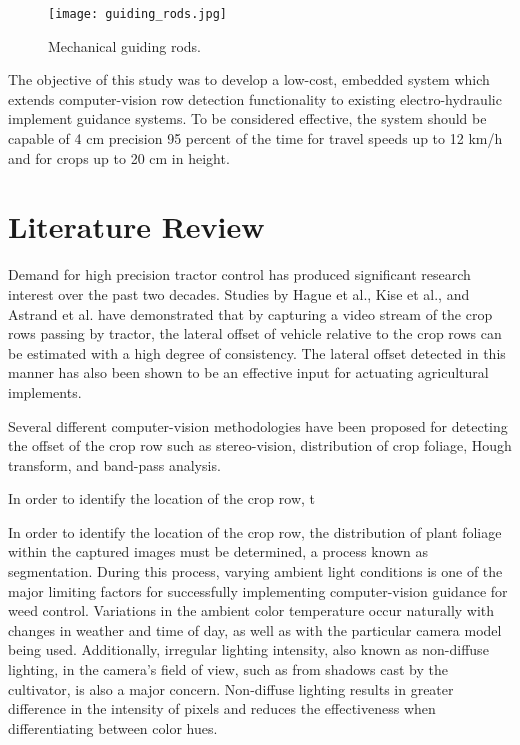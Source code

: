 \begin{figure}
  \centering
  \texttt{[image: guiding\_rods.jpg]}
  \caption{Mechanical guiding rods.}
  \label{fig:guiding_rods}
\end{figure}

The objective of this study was to develop a low-cost, embedded system
which extends computer-vision row detection functionality to existing
electro-hydraulic implement guidance systems.  To be considered
effective, the system should be capable of 4 cm precision 95 percent of the 
time for travel speeds up to 12 km/h and for crops up to 20 cm in
height.

\section{Literature Review}
Demand for high precision tractor control has produced significant
research interest over the past two decades. Studies by Hague et
al., Kise et al., and Astrand et al. have demonstrated that by 
capturing a video stream of the crop rows passing by tractor, the 
lateral offset of vehicle relative to the crop rows can be estimated
with a high degree of consistency. The lateral offset detected in this manner
has also been shown to be an effective input for actuating agricultural 
implements.

Several different computer-vision methodologies have been proposed for 
detecting the offset of the crop row such as stereo-vision, distribution
of crop foliage, Hough transform, and band-pass analysis.

In order to identify the location of the crop row, t

In order to identify the location of the crop row, the distribution of
plant foliage within the captured images must be determined, a process
known as segmentation. During this process, varying ambient light
conditions is one of the major limiting factors for successfully
implementing computer-vision guidance for weed control. Variations in
the ambient color temperature occur naturally with changes in weather
and time of day, as well as with the particular camera model being
used. Additionally, irregular lighting intensity, also known as
non-diffuse lighting, in the camera’s field of view, such as from
shadows cast by the cultivator, is also a major concern. Non-diffuse
lighting results in greater difference in the intensity of pixels and
reduces the effectiveness when differentiating between color hues.
 
